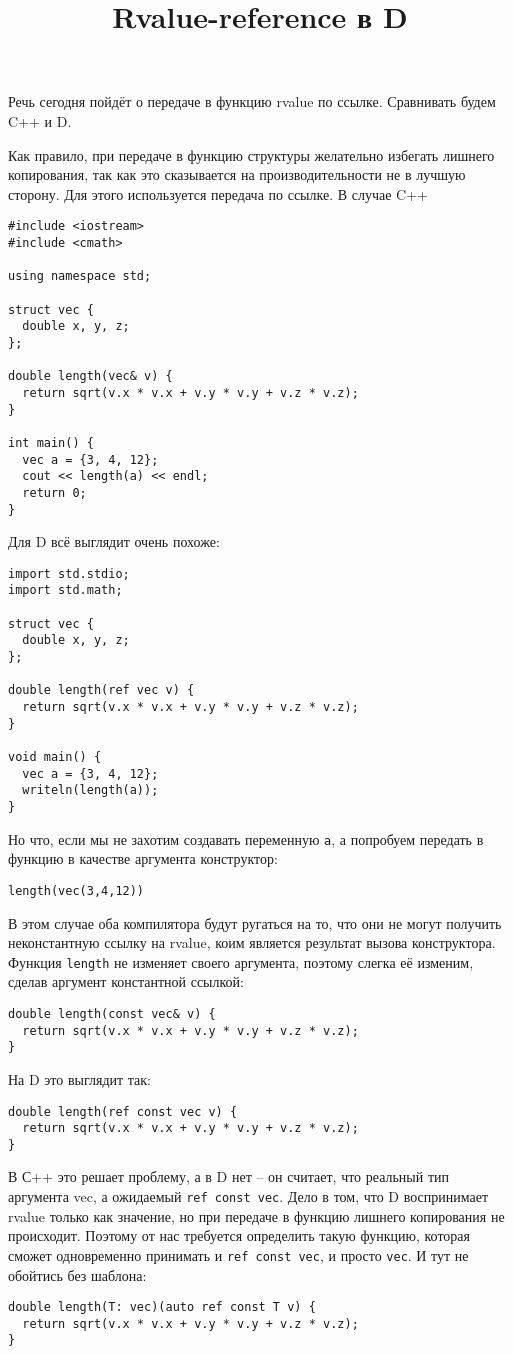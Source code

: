 
\title{Rvalue-reference в D}

\maketitle

Речь сегодня пойдёт о передаче в функцию rvalue по ссылке. Сравнивать будем C++ и D.

Как правило, при передаче в функцию структуры желательно избегать лишнего копирования, так как это сказывается на производительности не в лучшую сторону. Для этого используется передача по ссылке. В случае C++
\begin{verbatim}
#include <iostream>
#include <cmath>

using namespace std;

struct vec {
  double x, y, z;
};

double length(vec& v) {
  return sqrt(v.x * v.x + v.y * v.y + v.z * v.z);
}

int main() {
  vec a = {3, 4, 12};
  cout << length(a) << endl;
  return 0;
}
\end{verbatim}
Для D всё выглядит очень похоже:
\begin{verbatim}
import std.stdio;
import std.math;

struct vec {
  double x, y, z;
};

double length(ref vec v) {
  return sqrt(v.x * v.x + v.y * v.y + v.z * v.z);
}

void main() {
  vec a = {3, 4, 12};
  writeln(length(a));
}
\end{verbatim}
Но что, если мы не захотим создавать переменную \texttt{a}, а попробуем передать в функцию в качестве аргумента конструктор:
\begin{verbatim}
length(vec(3,4,12))
\end{verbatim}
В этом случае оба компилятора будут ругаться на то, что они не могут получить неконстантную ссылку на rvalue, коим является результат вызова конструктора. Функция \texttt{length} не изменяет своего аргумента, поэтому слегка её изменим, сделав аргумент константной ссылкой:
\begin{verbatim}
double length(const vec& v) {
  return sqrt(v.x * v.x + v.y * v.y + v.z * v.z);
}
\end{verbatim}
На D это выглядит так:
\begin{verbatim}
double length(ref const vec v) {
  return sqrt(v.x * v.x + v.y * v.y + v.z * v.z);
}
\end{verbatim}
В С++ это решает проблему, а в D нет -- он считает, что реальный тип аргумента vec, а ожидаемый \texttt{ref const vec}. Дело в том, что D воспринимает rvalue только как значение, но при передаче в функцию лишнего копирования не происходит. Поэтому от нас требуется определить такую функцию, которая сможет одновременно принимать и \texttt{ref const vec}, и просто \texttt{vec}. И тут не обойтись без шаблона:
\begin{verbatim}
double length(T: vec)(auto ref const T v) {
  return sqrt(v.x * v.x + v.y * v.y + v.z * v.z);
}
\end{verbatim}

